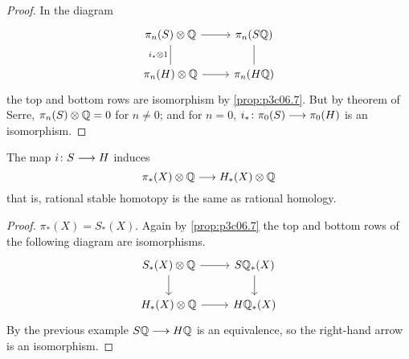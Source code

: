 \documentclass[../main]{subfiles}
\begin{document}
\begin{proof}
In the diagram
\[\begin{tikzcd}
	{\pi_n(S)\otimes \bQ} & {\pi_n(S\bQ)} \\
	{\pi_n(H)\otimes \bQ} & {\pi_n(H\bQ)}
	\arrow[from=1-1, to=1-2]
	\arrow[from=2-1, to=2-2]
	\arrow["{i_\ast \otimes 1}"', no head, from=1-1, to=2-1]
	\arrow[no head, from=1-2, to=2-2]
\end{tikzcd}\]
the top and bottom rows are isomorphism by \ref{prop:p3c06.7}. But by theorem of Serre, $\pi_n(S)\otimes \mathbb{Q}=0$ for $n\neq 0$; and for $n=0$, $i_\ast\colon\pi_0(S)\longrightarrow\pi_0(H)$ is an isomorphism.
\end{proof}

\begin{example}
 The map $i\colon S \longrightarrow H$ induces
 \[\pi_\ast(X)\otimes \mathbb{Q}\longrightarrow H_\ast(X)\otimes \mathbb{Q}\]
 that is, rational stable homotopy is the same as rational homology.
\end{example}

\begin{proof}
$\pi_\ast(X)=S_\ast(X)$. Again by \ref{prop:p3c06.7} the top and bottom rows of the following diagram are isomorphisms.
\[\begin{tikzcd}
	{S_\ast(X)\otimes \bQ} & {S\bQ_\ast(X)} \\
	{H_\ast(X)\otimes \bQ} & {H\bQ_\ast(X)}
	\arrow[from=1-1, to=1-2]
	\arrow[from=1-1, to=2-1]
	\arrow[from=1-2, to=2-2]
	\arrow[from=2-1, to=2-2]
\end{tikzcd}\]
By the previous example $S\mathbb{Q}\longrightarrow H\mathbb{Q}$ is an equivalence, so the right-hand arrow is an isomorphism.
\end{proof}
\end{document}
